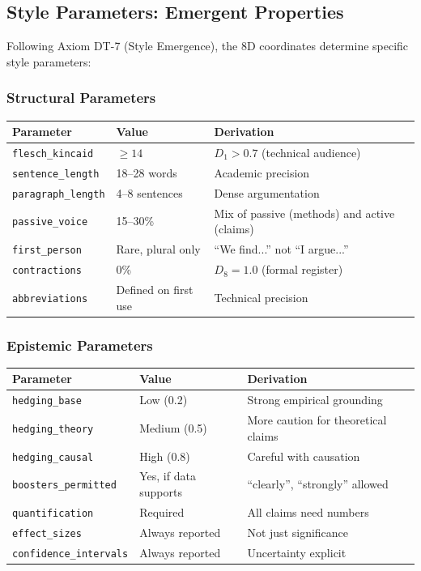 \subsection{Style Parameters: Emergent Properties}

Following Axiom DT-7 (Style Emergence), the 8D coordinates determine specific
style parameters:

\subsubsection{Structural Parameters}

\begin{center}
\renewcommand{\arraystretch}{1.2}
\begin{tabular}{lll}
\toprule
\textbf{Parameter} & \textbf{Value} & \textbf{Derivation} \\
\midrule
\texttt{flesch\_kincaid} & $\geq 14$ & $D_1 > 0.7$ (technical audience) \\
\texttt{sentence\_length} & 18--28 words & Academic precision \\
\texttt{paragraph\_length} & 4--8 sentences & Dense argumentation \\
\texttt{passive\_voice} & 15--30\% & Mix of passive (methods) and active (claims) \\
\texttt{first\_person} & Rare, plural only & ``We find...'' not ``I argue...'' \\
\texttt{contractions} & 0\% & $D_8 = 1.0$ (formal register) \\
\texttt{abbreviations} & Defined on first use & Technical precision \\
\bottomrule
\end{tabular}
\end{center}

\subsubsection{Epistemic Parameters}

\begin{center}
\renewcommand{\arraystretch}{1.2}
\begin{tabular}{lll}
\toprule
\textbf{Parameter} & \textbf{Value} & \textbf{Derivation} \\
\midrule
\texttt{hedging\_base} & Low (0.2) & Strong empirical grounding \\
\texttt{hedging\_theory} & Medium (0.5) & More caution for theoretical claims \\
\texttt{hedging\_causal} & High (0.8) & Careful with causation \\
\texttt{boosters\_permitted} & Yes, if data supports & ``clearly'', ``strongly'' allowed \\
\texttt{quantification} & Required & All claims need numbers \\
\texttt{effect\_sizes} & Always reported & Not just significance \\
\texttt{confidence\_intervals} & Always reported & Uncertainty explicit \\
\bottomrule
\end{tabular}
\end{center}

